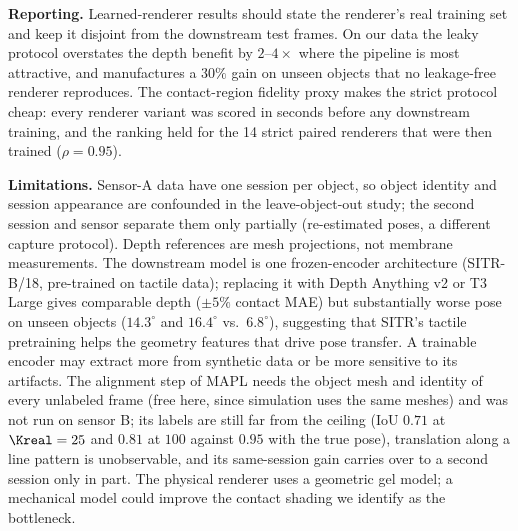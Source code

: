 \noindent\textbf{Reporting.}
Learned-renderer results should state the renderer's real training set and keep it disjoint from the downstream test frames. On our data the leaky protocol overstates the depth benefit by $2$--$4\times$ where the pipeline is most attractive, and manufactures a $30\%$ gain on unseen objects that no leakage-free renderer reproduces. The contact-region fidelity proxy makes the strict protocol cheap: every renderer variant was scored in seconds before any downstream training, and the ranking held for the 14 strict paired renderers that were then trained ($\rho=0.95$).

\noindent\textbf{Limitations.}
Sensor-A data have one session per object, so object identity and session appearance are confounded in the leave-object-out study; the second session and sensor separate them only partially (re-estimated poses, a different capture protocol). Depth references are mesh projections, not membrane measurements. The downstream model is one frozen-encoder architecture (SITR-B/18, pre-trained on tactile data); replacing it with Depth Anything v2 or T3 Large gives comparable depth ($\pm5\%$ contact MAE) but substantially worse pose on unseen objects ($14.3^\circ$ and $16.4^\circ$ vs.\ $6.8^\circ$), suggesting that SITR's tactile pretraining helps the geometry features that drive pose transfer. A trainable encoder may extract more from synthetic data or be more sensitive to its artifacts. The alignment step of MAPL needs the object mesh and identity of every unlabeled frame (free here, since simulation uses the same meshes) and was not run on sensor B; its labels are still far from the ceiling (IoU $0.71$ at $\Kreal=25$ and $0.81$ at $100$ against $0.95$ with the true pose), translation along a line pattern is unobservable, and its same-session gain carries over to a second session only in part. The physical renderer uses a geometric gel model; a mechanical model could improve the contact shading we identify as the bottleneck.

